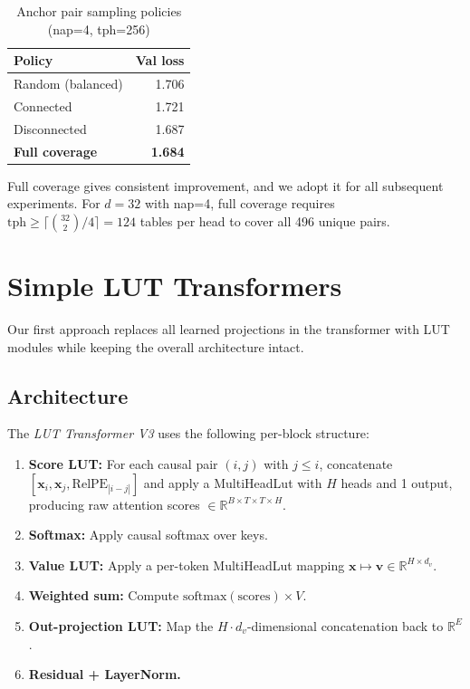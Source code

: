 \documentclass[11pt]{article}
\begin{document}
\begin{table}[!t]
\caption{Anchor pair sampling policies (nap=4, tph=256)}
\label{tab:sampling}
\centering
\begin{tabular}{lr}
\toprule
Policy & Val loss \\
\midrule
Random (balanced) & 1.706 \\
Connected & 1.721 \\
Disconnected & 1.687 \\
\textbf{Full coverage} & \textbf{1.684} \\
\bottomrule
\end{tabular}
\end{table}

Full coverage gives consistent improvement, and we adopt it for all subsequent experiments.
For $d = 32$ with nap=4, full coverage requires $\mathrm{tph} \geq \lceil\binom{32}{2} / 4\rceil = 124$ tables per head to cover all 496 unique pairs.


\section{Simple LUT Transformers}
\label{sec:simple_lut}

Our first approach replaces all learned projections in the transformer with LUT modules while keeping the overall architecture intact.

\subsection{Architecture}

The \emph{LUT Transformer V3} uses the following per-block structure:
\begin{enumerate}
    \item \textbf{Score LUT:} For each causal pair $(i, j)$ with $j \leq i$, concatenate $[\mathbf{x}_i, \mathbf{x}_j, \mathrm{RelPE}_{|i-j|}]$ and apply a MultiHeadLut with $H$ heads and 1 output, producing raw attention scores $\in \mathbb{R}^{B \times T \times T \times H}$.
    \item \textbf{Softmax:} Apply causal softmax over keys.
    \item \textbf{Value LUT:} Apply a per-token MultiHeadLut mapping $\mathbf{x} \mapsto \mathbf{v} \in \mathbb{R}^{H \times d_v}$.
    \item \textbf{Weighted sum:} Compute $\mathrm{softmax}(\text{scores}) \times V$.
    \item \textbf{Out-projection LUT:} Map the $H \cdot d_v$-dimensional concatenation back to $\mathbb{R}^E$.
    \item \textbf{Residual + LayerNorm.}
\end{enumerate}
\end{document}
